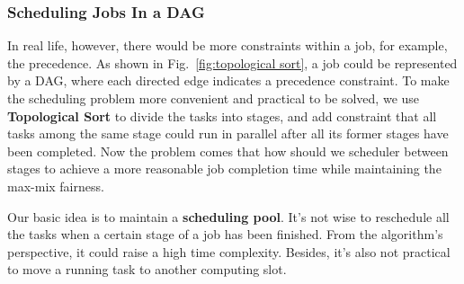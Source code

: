 \documentclass{llncs}
\begin{document}
\subsubsection{Scheduling Jobs In a DAG}
In real life, however, there would be more constraints within a job, for example, the precedence. As shown in Fig.~\ref{fig:topological sort}, a job could be represented by a DAG, where each directed edge indicates a precedence constraint. To make the scheduling problem more convenient and practical to be solved, we use {\bf Topological Sort} to divide the tasks into stages, and add constraint that all tasks among the same stage could run in parallel after all its former stages have been completed. Now the problem comes that how should we scheduler between stages to achieve a more reasonable job completion time while maintaining the max-mix fairness.

Our basic idea is to maintain a {\bf scheduling pool}. It's not wise to reschedule all the tasks when a certain stage of a job has been finished. From the algorithm's perspective, it could raise a high time complexity. Besides, it's also not practical to move a running task to another computing slot. 
\end{document}
